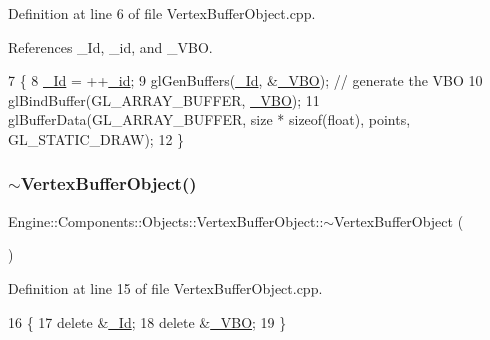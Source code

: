 Definition at line 6 of file Vertex\+Buffer\+Object.\+cpp.



References \+\_\+\+Id, \+\_\+id, and \+\_\+\+V\+BO.


\begin{DoxyCode}
7 \{
8     \mbox{\hyperlink{classEngine_1_1Components_1_1Objects_1_1VertexBufferObject_a07adfeae7d3b23285d49b8005437ed77}{\_Id}} = ++\mbox{\hyperlink{classEngine_1_1Components_1_1Objects_1_1VertexBufferObject_aee6f39eda87eb0f8c0e6644afdd72000}{\_id}};
9     glGenBuffers(\mbox{\hyperlink{classEngine_1_1Components_1_1Objects_1_1VertexBufferObject_a07adfeae7d3b23285d49b8005437ed77}{\_Id}}, &\mbox{\hyperlink{classEngine_1_1Components_1_1Objects_1_1VertexBufferObject_a0014c1ab3ceb3c3437003057638b279f}{\_VBO}}); \textcolor{comment}{// generate the VBO}
10     glBindBuffer(GL\_ARRAY\_BUFFER, \mbox{\hyperlink{classEngine_1_1Components_1_1Objects_1_1VertexBufferObject_a0014c1ab3ceb3c3437003057638b279f}{\_VBO}});
11     glBufferData(GL\_ARRAY\_BUFFER, size * \textcolor{keyword}{sizeof}(\textcolor{keywordtype}{float}), points, GL\_STATIC\_DRAW);
12 \}
\end{DoxyCode}
\mbox{\label{classEngine_1_1Components_1_1Objects_1_1VertexBufferObject_a477c0af2a3eaaae725a1347027ef87a4}} 
\subsubsection{\texorpdfstring{$\sim$\+Vertex\+Buffer\+Object()}{~VertexBufferObject()}}
{\footnotesize\ttfamily Engine\+::\+Components\+::\+Objects\+::\+Vertex\+Buffer\+Object\+::$\sim$\+Vertex\+Buffer\+Object (\begin{DoxyParamCaption}{ }\end{DoxyParamCaption})}



Definition at line 15 of file Vertex\+Buffer\+Object.\+cpp.


\begin{DoxyCode}
16 \{
17     \textcolor{keyword}{delete} &\mbox{\hyperlink{classEngine_1_1Components_1_1Objects_1_1VertexBufferObject_a07adfeae7d3b23285d49b8005437ed77}{\_Id}};
18     \textcolor{keyword}{delete} &\mbox{\hyperlink{classEngine_1_1Components_1_1Objects_1_1VertexBufferObject_a0014c1ab3ceb3c3437003057638b279f}{\_VBO}};
19 \}
\end{DoxyCode}


